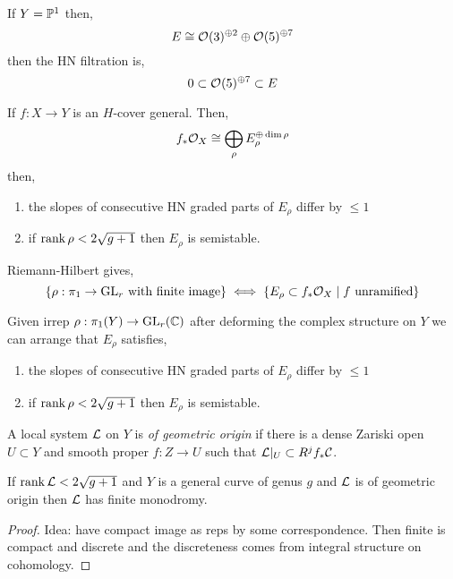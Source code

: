 \documentclass[12pt]{article}
\begin{document}
\begin{example}
If $Y = \P^1$ then,
\[ E \cong \struct{}(3)^{\oplus 2} \oplus \struct{}(5)^{\oplus 7} \]
then the HN filtration is,
\[ 0 \subset \struct{}(5)^{\oplus 7} \subset E \]
\end{example}

\begin{theorem}[L-Litt]
If $f : X \to Y$ is an $H$-cover general. Then,
\[ f_* \struct{X} \cong \bigoplus_{\rho} E_\rho^{\oplus \dim{\rho}} \]
then,
\begin{enumerate}
\item the slopes of consecutive HN graded parts of $E_\rho$ differ by $\le 1$

\item if $\rank{\rho} < 2 \sqrt{g+1}$ then $E_\rho$ is semistable. 
\end{enumerate}
\end{theorem}

\begin{theorem}
Riemann-Hilbert gives,
\[ \{ \rho : \pi_1 \to \GL_r \text{ with finite image} \} \iff \{ E_\rho \subset f_* \struct{X} \mid f \text{ unramified} \} \]
\end{theorem}

\begin{theorem}
Given irrep $\rho : \pi_1(Y) \to \GL_r(\CC)$ after deforming the complex structure on $Y$ we can arrange that $E_\rho$ satisfies,
\begin{enumerate}
\item the slopes of consecutive HN graded parts of $E_\rho$ differ by $\le 1$

\item if $\rank{\rho} < 2 \sqrt{g+1}$ then $E_\rho$ is semistable. 
\end{enumerate}
\end{theorem}

\begin{defn}
A local system $\L$ on $Y$ is \textit{of geometric origin} if there is a dense Zariski open $U \subset Y$ and smooth proper $f : Z \to U$ such that $\L|_U \subset R^j f_* \C$. 
\end{defn}

\begin{theorem}[L-Litt]
If $\rank{\L} < 2 \sqrt{g+1}$ and $Y$ is a general curve of genus $g$ and $\L$ is of geometric origin then $\L$ has finite monodromy. 
\end{theorem}

\begin{proof}
Idea: have compact image as reps by some correspondence. Then finite is compact and discrete and the discreteness comes from integral structure on cohomology.
\end{proof}
\end{document}
